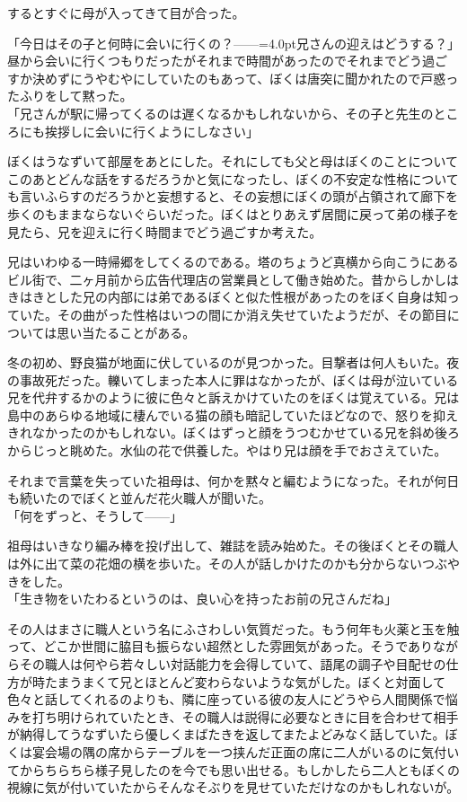 \documentclass[b5j,twoside,twocolumn]{utarticle}
\begin{document}
するとすぐに母が入ってきて目が合った。


「今日はその子と何時に会いに行くの？\tbaselineshift=2.5pt------\tbaselineshift=4.0pt兄さんの迎えはどうする？」\\
昼から会いに行くつもりだったがそれまで時間があったのでそれまでどう過ごすか決めずにうやむやにしていたのもあって、ぼくは唐突に聞かれたので戸惑ったふりをして黙った。\\
「兄さんが駅に帰ってくるのは遅くなるかもしれないから、その子と先生のところにも挨拶しに会いに行くようにしなさい」


ぼくはうなずいて部屋をあとにした。それにしても父と母はぼくのことについてこのあとどんな話をするだろうかと気になったし、ぼくの不安定な性格についても言いふらすのだろうかと妄想すると、その妄想にぼくの頭が占領されて廊下を歩くのもままならないぐらいだった。ぼくはとりあえず居間に戻って弟の様子を見たら、兄を迎えに行く時間までどう過ごすか考えた。


兄はいわゆる一時帰郷をしてくるのである。塔のちょうど真横から向こうにあるビル街で、二ヶ月前から広告代理店の営業員として働き始めた。昔からしかしはきはきとした兄の内部には弟であるぼくと似た性根があったのをぼく自身は知っていた。その曲がった性格はいつの間にか消え失せていたようだが、その節目については思い当たることがある。


冬の初め、野良猫が地面に伏しているのが見つかった。目撃者は何人もいた。夜の事故死だった。轢いてしまった本人に罪はなかったが、ぼくは母が泣いている兄を代弁するかのように彼に色々と訴えかけていたのをぼくは覚えている。兄は島中のあらゆる地域に棲んでいる猫の顔も暗記していたほどなので、怒りを抑えきれなかったのかもしれない。ぼくはずっと顔をうつむかせている兄を斜め後ろからじっと眺めた。水仙の花で供養した。やはり兄は顔を手でおさえていた。


それまで言葉を失っていた祖母は、何かを黙々と編むようになった。それが何日も続いたのでぼくと並んだ花火職人が聞いた。\\
「何をずっと、そうして\tbaselineshift=2.5pt------\tbaselineshift=4.0pt」


祖母はいきなり編み棒を投げ出して、雑誌を読み始めた。その後ぼくとその職人は外に出て菜の花畑の横を歩いた。その人が話しかけたのかも分からないつぶやきをした。\\
「生き物をいたわるというのは、良い心を持ったお前の兄さんだね」


その人はまさに職人という名にふさわしい気質だった。もう何年も火薬と玉を触って、どこか世間に脇目も振らない超然とした雰囲気があった。そうでありながらその職人は何やら若々しい対話能力を会得していて、語尾の調子や目配せの仕方が時たまうまくて兄とほとんど変わらないような気がした。ぼくと対面して色々と話してくれるのよりも、隣に座っている彼の友人にどうやら人間関係で悩みを打ち明けられていたとき、その職人は説得に必要なときに目を合わせて相手が納得してうなずいたら優しくまばたきを返してまたよどみなく話していた。ぼくは宴会場の隅の席からテーブルを一つ挟んだ正面の席に二人がいるのに気付いてからちらちら様子見したのを今でも思い出せる。もしかしたら二人ともぼくの視線に気が付いていたからそんなそぶりを見せていただけなのかもしれないが。
\end{document}
